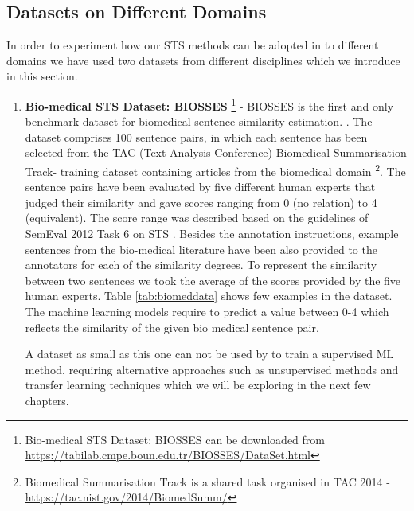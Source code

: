 \subsection{Datasets on Different Domains}
In order to experiment how our STS methods can be adopted in to different domains we have used two datasets from different disciplines which we introduce in this section. 
\begin{enumerate}
	
	\item{ \textbf{Bio-medical STS Dataset: BIOSSES } \footnote{Bio-medical STS Dataset: BIOSSES  can be downloaded from \url{https://tabilab.cmpe.boun.edu.tr/BIOSSES/DataSet.html} }} - BIOSSES is the first and only benchmark dataset for biomedical  sentence  similarity  estimation.
	\cite{10.1093/bioinformatics/btx238}. The  dataset  comprises 100 sentence pairs, in which each sentence has been selected from the TAC (Text Analysis Conference) Biomedical Summarisation Track- training dataset containing articles from  the  biomedical domain \footnote{Biomedical Summarisation Track is a shared task organised in TAC 2014 - \url{https://tac.nist.gov/2014/BiomedSumm/}}. The sentence pairs have been evaluated by five different human experts that judged their similarity and gave scores ranging from 0 (no relation) to 4 (equivalent). The score range was described based on the guidelines of SemEval 2012 Task 6 on STS \cite{agirre-etal-2012-semeval}. Besides the annotation instructions, example sentences from the bio-medical literature 
	have been also provided to the annotators for each of the similarity degrees. To represent the similarity between two sentences we took the average of the scores provided by the five human experts. Table \ref{tab:biomeddata} shows few examples in the dataset. The machine learning models require to predict a value between 0-4 which reflects the similarity of the given bio medical sentence pair.
	
	A dataset as small as this one can not be used by to train a supervised ML method, requiring alternative approaches such as unsupervised methods and transfer learning techniques which we will be exploring in the next few chapters.
	

\end{enumerate}
